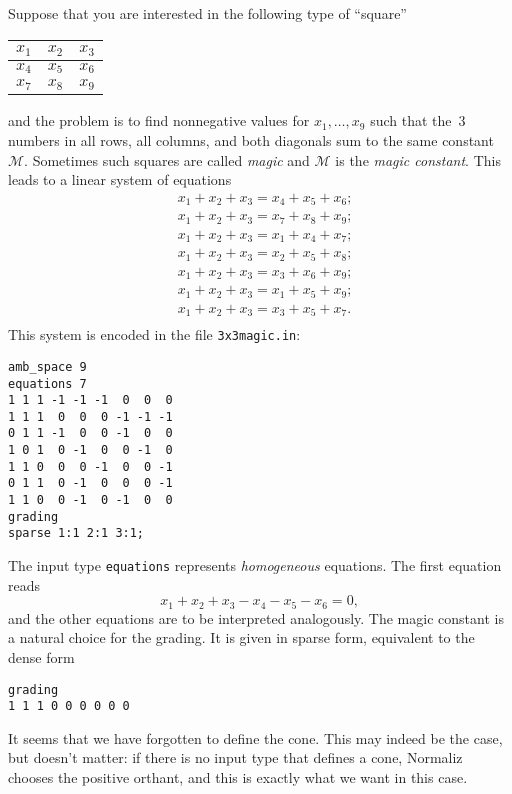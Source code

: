 \documentclass[12pt,a4paper]{scrartcl}
\theoremstyle{definition}
\def\ttt{\texttt}
\begin{document}
Suppose that you are interested in the following type of ``square''
\begin{center}
	\begin{tabular}{|l|l|l|}
		\hline
		$x_1$ & $x_2$ & $x_3$\\
		\hline
		$x_4$ & $x_5$ & $x_6$\\
		\hline
		$x_7$ & $x_8$ & $x_9$\\
		\hline
	\end{tabular}
\end{center}
and the problem is to find nonnegative values for $x_1,\dots,x_9$
such that the~$3$ numbers in all rows, all columns, and both
diagonals sum to the same constant $\mathcal{M}$. Sometimes
such squares are called \emph{magic} and $\mathcal M$ is the
\emph{magic constant}. This leads to a linear system of
equations
\begin{align*}
& x_1+x_2+x_3=x_4+x_5+x_6;\\
& x_1+x_2+x_3=x_7+x_8+x_9;\\
& x_1+x_2+x_3=x_1+x_4+x_7;\\
& x_1+x_2+x_3=x_2+x_5+x_8;\\
& x_1+x_2+x_3=x_3+x_6+x_9;\\
& x_1+x_2+x_3=x_1+x_5+x_9;\\
& x_1+x_2+x_3=x_3+x_5+x_7.\\
\end{align*}
This system is encoded in the file
\ttt{3x3magic.in}:
\begin{Verbatim}
amb_space 9
equations 7
1 1 1 -1 -1 -1  0  0  0
1 1 1  0  0  0 -1 -1 -1
0 1 1 -1  0  0 -1  0  0
1 0 1  0 -1  0  0 -1  0
1 1 0  0  0 -1  0  0 -1
0 1 1  0 -1  0  0  0 -1
1 1 0  0 -1  0 -1  0  0
grading
sparse 1:1 2:1 3:1;
\end{Verbatim}

The input type \verb|equations| represents \emph{homogeneous} equations. The first equation reads
$$
x_1+x_2+x_3-x_4-x_5-x_6=0,
$$
and the other equations are to be interpreted analogously. The magic constant is a natural choice for the grading. It is given in sparse form, equivalent to the dense form
\begin{Verbatim}
grading
1 1 1 0 0 0 0 0 0
\end{Verbatim}

It seems that we have forgotten to define the cone. This may indeed be the case, but doesn't matter: if there is no input type that defines a cone, Normaliz chooses the positive orthant, and this is exactly what we want in this case.
\end{document}
